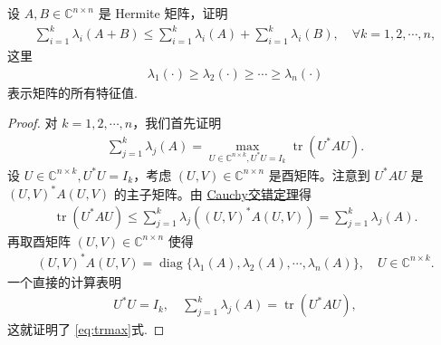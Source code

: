 \documentclass[../../main.tex]{subfiles}%
\begin{document}
\begin{example}
设 $A,B\in\mathbb{C}^{n\times n}$ 是 Hermite 矩阵，证明
\begin{align*}
\sum_{i=1}^k \lambda_i(A+B) \leqslant \sum_{i=1}^k \lambda_i(A) + \sum_{i=1}^k \lambda_i(B), \quad \forall k=1,2,\cdots,n,
\end{align*}
这里
\begin{align*}
\lambda_1(\cdot)\geqslant \lambda_2(\cdot)\geqslant \cdots \geqslant \lambda_n(\cdot)
\end{align*}
表示矩阵的所有特征值.
\end{example}
\begin{proof}
对 $k=1,2,\cdots,n$，我们首先证明
\begin{align}
\sum_{j=1}^k \lambda_j(A) = \max_{U\in\mathbb{C}^{n\times k}, U^*U=I_k} \operatorname{tr}(U^*AU).
\label{eq:trmax}
\end{align}
设 $U\in\mathbb{C}^{n\times k}, U^*U=I_k$，考虑 $(U,V)\in\mathbb{C}^{n\times n}$ 是酉矩阵。注意到 $U^*AU$ 是 $(U,V)^*A(U,V)$ 的主子矩阵。由 \hyperref[theorem:Cauchy交错定理]{Cauchy交错定理}得
\begin{align*}
\operatorname{tr}(U^*AU) \leqslant \sum_{j=1}^k \lambda_j((U,V)^*A(U,V)) = \sum_{j=1}^k \lambda_j(A).
\end{align*}
再取酉矩阵 $(U,V)\in\mathbb{C}^{n\times n}$ 使得
\begin{align*}
(U,V)^*A(U,V) = \operatorname{diag}\{\lambda_1(A),\lambda_2(A),\cdots,\lambda_n(A)\}, \quad U\in\mathbb{C}^{n\times k}.
\end{align*}
一个直接的计算表明
\begin{align*}
U^*U=I_k,\quad \sum_{j=1}^k \lambda_j(A)=\operatorname{tr}(U^*AU),
\end{align*}
这就证明了 \eqref{eq:trmax}式.
\end{proof}
\end{document}
